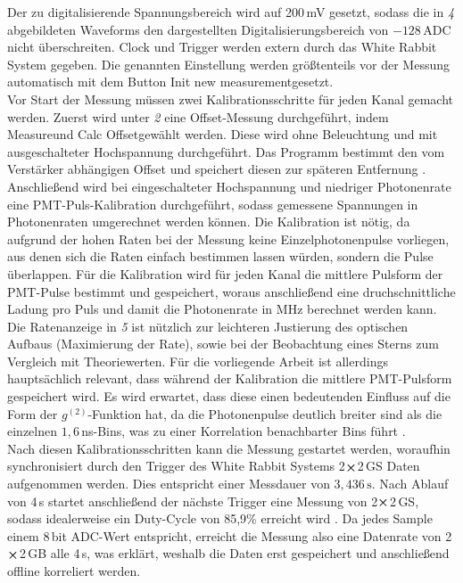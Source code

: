Der zu digitalisierende Spannungsbereich wird auf 200\,mV gesetzt, sodass die in \emph{4} abgebildeten Waveforms den dargestellten Digitalisierungsbereich von $-128\,\mathrm{ADC}$ nicht überschreiten. 
Clock und Trigger werden extern durch das White Rabbit System gegeben. 
Die genannten Einstellung werden größtenteils vor der Messung automatisch mit dem Button \glqq Init new measurement\grqq\;gesetzt. \\
Vor Start der Messung müssen zwei Kalibrationsschritte für jeden Kanal gemacht werden. 
Zuerst wird unter \emph{2} eine Offset-Messung durchgeführt, indem \glqq Measure\grqq\;und \glqq Calc Offset\grqq\;gewählt werden. 
Diese wird ohne Beleuchtung und mit ausgeschalteter Hochspannung durchgeführt. 
Das Programm bestimmt den vom Verstärker abhängigen Offset und speichert diesen zur späteren Entfernung \cite{zmijaOpticalIntensityInterferometry2021}. 
Anschließend wird bei eingeschalteter Hochspannung und niedriger Photonenrate eine PMT-Puls-Kalibration durchgeführt, sodass gemessene Spannungen in Photonenraten umgerechnet werden können. 
Die Kalibration ist nötig, da aufgrund der hohen Raten bei der Messung keine Einzelphotonenpulse vorliegen, aus denen sich die Raten einfach bestimmen lassen würden, sondern die Pulse überlappen.
Für die Kalibration wird für jeden Kanal die mittlere Pulsform der PMT-Pulse bestimmt und gespeichert, woraus anschließend eine druchschnittliche Ladung pro Puls und damit die Photonenrate in MHz berechnet werden kann.
Die Ratenanzeige in \emph{5} ist nützlich zur leichteren Justierung des optischen Aufbaus (Maximierung der Rate), sowie bei der Beobachtung eines Sterns zum Vergleich mit Theoriewerten.
Für die vorliegende Arbeit ist allerdings hauptsächlich relevant, dass während der Kalibration die mittlere PMT-Pulsform gespeichert wird.
Es wird erwartet, dass diese einen bedeutenden Einfluss auf die Form der $g^{(2)}$-Funktion hat, da die Photonenpulse deutlich breiter sind als die einzelnen $1{,}6$\,ns-Bins, was zu einer Korrelation benachbarter Bins führt \cite{zmijaOpticalIntensityInterferometry2021}. \\
Nach diesen Kalibrationsschritten kann die Messung gestartet werden, woraufhin synchronisiert durch den Trigger des White Rabbit Systems 2$\cross$2\,GS Daten aufgenommen werden. 
Dies entspricht einer Messdauer von $3{,}436\,\mathrm{s}$. 
Nach Ablauf von 4\,s startet anschließend der nächste Trigger eine Messung von 2$\cross$2\,GS, sodass idealerweise ein Duty-Cycle von 85{,}9\% erreicht wird \cite{zmijaFirstIntensityInterferometry2023}. 
Da jedes Sample einem 8\,bit ADC-Wert entspricht, erreicht die Messung also eine Datenrate von 2$\cross$2\,GB alle 4\,s, was erklärt, weshalb die Daten erst gespeichert und anschließend offline korreliert werden. 
